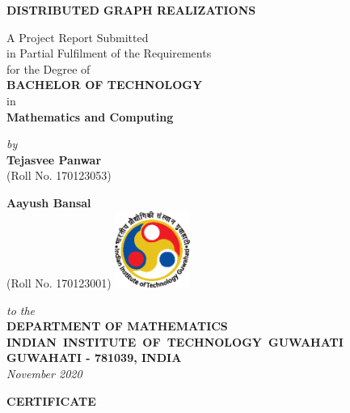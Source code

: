 \documentclass[12pt]{report}
\theoremstyle{plain}
\theoremstyle{definition}
\theoremstyle{remark}
\begin{document}

\begin{titlepage}
\enlargethispage{3cm}

\begin{center}

\vspace*{-2cm}

\textbf{\Large DISTRIBUTED GRAPH REALIZATIONS}

\vfill

 A Project Report Submitted \\
 in Partial Fulfilment of the Requirements  \\
  for the Degree of  \\[10pt]

 {\Large \bf BACHELOR OF TECHNOLOGY}\\[5pt]
 in \\
 {\large \bf Mathematics and Computing}

 \vfill

{\large \emph{by}}\\[5pt]
{\large\bf {Tejasvee Panwar}}\\[5pt]
{\large (Roll No. 170123053)}

{\large\bf {Aayush Bansal}}\\[5pt]
{\large (Roll No. 170123001)}
\vfill
\includegraphics[height=2.5cm]{iitglogo.eps}

\vspace*{0.5cm}

{\em\large to the}\\[10pt]
{\bf\large DEPARTMENT OF MATHEMATICS} \\[5pt]
{\bf\large \mbox{INDIAN INSTITUTE OF TECHNOLOGY GUWAHATI}}\\[5pt]
{\bf\large GUWAHATI - 781039, INDIA}\\[10pt]
{\it\large November 2020}
\end{center}

\end{titlepage}

\clearpage

 \setcounter{page}{2}
\begin{center}
{\Large{\bf{CERTIFICATE}}}
\end{center}
\end{document}
